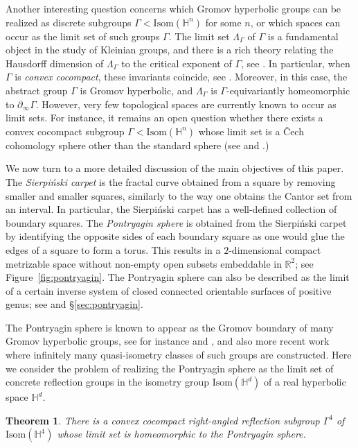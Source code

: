 \documentclass{amsart}
\theoremstyle{plain}
\newtheorem{theorem}{Theorem}[section]
\theoremstyle{definition}
\theoremstyle{remark}
\numberwithin{equation}{section}
\newcommand{\rr}{\mathbb R}
\newcommand{\hh}{\mathbb H}
\begin{document}
Another interesting question concerns which Gromov hyperbolic groups can be realized as discrete subgroups $\Gamma < \mathrm{Isom} (\hh^n)$ for some $n$, or which spaces can occur as the limit set of such groups $\Gamma$. The limit set $\Lambda_{\Gamma}$ of $\Gamma$ is a fundamental object in the study of Kleinian groups, and there is a rich theory relating the Hausdorff dimension of $\Lambda_{\Gamma}$ to the critical exponent of $\Gamma$, see \cite{KAP09}. In particular, when $\Gamma$ is {\em convex cocompact}, these invariants  coincide, see \cite{SU79}. Moreover, in this case, the abstract group $\Gamma$ is Gromov hyperbolic, and $\Lambda_\Gamma$ is $\Gamma$-equivariantly homeomorphic to $\partial_\infty \Gamma$. 
However, very few topological spaces are currently known to occur as limit sets. For instance, it remains an open question whether there exists a convex cocompact subgroup $\Gamma < \mathrm{Isom} (\hh^n)$ whose limit set is a \v Cech cohomology sphere other than the standard sphere (see \cite[Question 9.5]{Kapovich08} and \cite{BM91}.)

We now turn to a more detailed discussion of the main objectives of this paper.
 The  \textit{Sierpi\'nski carpet} is the fractal curve obtained from a square by removing smaller and smaller squares, similarly to  the way one obtains the Cantor set  from an interval.
In particular, the Sierpi\'nski carpet  has a well-defined collection of boundary squares.
The \textit{Pontryagin sphere} is obtained from the Sierpi\'nski carpet  by identifying the opposite sides of each boundary square as one would glue the edges of a square to form a torus.
This results in a $2$-dimensional compact metrizable space without non-empty open subsets embeddable in  $\rr^2$; see Figure~\ref{fig:pontryagin}.
The Pontryagin sphere can also be described as the  limit of a certain inverse system of closed connected  orientable surfaces of positive genus; see \cite{JA91,FI03,ZA10,SW20,SW20sp} and \S\ref{sec:pontryagin}. 

The Pontryagin sphere is known to appear as the Gromov boundary of many Gromov hyperbolic groups, see for instance \cite[Remark 4.4]{PS09} and \cite{JS06,ZA10}, and also more recent work \cite{FGLS25, CDSS25} where infinitely many quasi-isometry classes of such groups are constructed.
Here we consider the problem of realizing the Pontryagin sphere as the limit set of concrete reflection groups in the isometry group $\mathrm{Isom} (\hh^d)$ of a real hyperbolic space $\hh^d$.

\begin{theorem}\label{main4}
There is a convex cocompact right-angled reflection subgroup $\Gamma^4$ of $\mathrm{Isom} (\hh^4)$   whose limit set is homeomorphic to the Pontryagin sphere.
\end{theorem}
\end{document}
